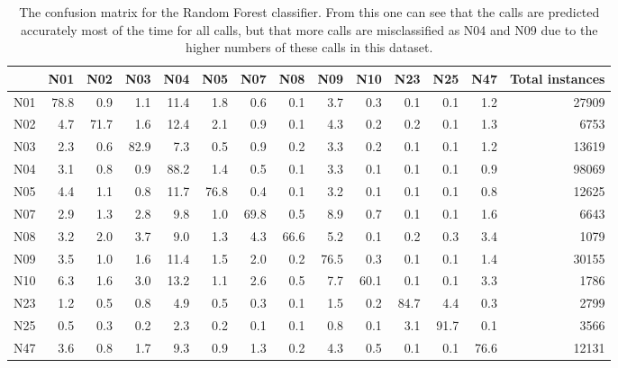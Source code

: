 \documentclass[12pt,oneside]{book}
\begin{document}
\begin{table}
\small
\begin{tabular}{|l|r|r|r|r|r|r|r|r|r|r|r|r|r|}
\hline
      &    N01  &   N02  &    N03  &    N04  &   N05  &   N07  &  N08  &    N09  &   N10  &   N23  &   N25  &   N47  & Total instances\\
\hline
 N01  &  78.8   &   0.9   &   1.1  &  11.4   &  1.8   &   0.6  &   0.1  &  3.7   &   0.3  &  0.1   &   0.1  &  1.2   & 27909  \\
 N02  &   4.7   &  71.7   &   1.6  &  12.4   &  2.1   &   0.9  &   0.1 &   4.3   &   0.2  &  0.2   &   0.1  &  1.3   & 6753   \\
 N03  &   2.3   &   0.6   &  82.9  &   7.3   &  0.5   &   0.9  &   0.2 &   3.3   &   0.2  &  0.1   &   0.1  &  1.2   & 13619  \\
 N04  &   3.1   &   0.8   &   0.9  &  88.2   &  1.4   &   0.5  &   0.1 &   3.3   &   0.1  &  0.1   &   0.1  &  0.9   & 98069  \\
 N05  &   4.4   &   1.1   &   0.8  &  11.7   & 76.8   &   0.4  &   0.1 &   3.2   &   0.1  &  0.1   &   0.1  &  0.8   & 12625  \\
 N07  &   2.9   &   1.3   &   2.8  &   9.8   &  1.0   &  69.8  &   0.5 &   8.9   &   0.7  &  0.1   &   0.1  &  1.6   & 6643   \\
 N08  &   3.2   &   2.0   &   3.7  &   9.0   &  1.3   &   4.3  &  66.6 &   5.2   &   0.1  &  0.2   &   0.3  &  3.4   & 1079   \\
 N09  &   3.5   &   1.0   &   1.6  &  11.4   &  1.5   &   2.0  &   0.2 &  76.5   &   0.3  &  0.1   &   0.1  &  1.4   & 30155  \\
 N10  &   6.3   &   1.6   &   3.0  &  13.2   &  1.1   &   2.6  &   0.5 &   7.7   &  60.1  &  0.1   &   0.1  &  3.3   & 1786   \\
 N23  &   1.2   &   0.5   &   0.8  &   4.9   &  0.5   &   0.3  &   0.1 &   1.5   &   0.2  & 84.7   &   4.4  &  0.3   & 2799   \\
 N25  &   0.5   &   0.3   &   0.2  &   2.3   &  0.2   &   0.1  &   0.1 &   0.8   &   0.1  &  3.1   &  91.7  &  0.1   & 3566   \\
 N47  &   3.6   &   0.8   &   1.7  &   9.3   &  0.9   &   1.3  &   0.2 &   4.3   &   0.5  &  0.1   &   0.1  & 76.6   & 12131  \\
\hline
\end{tabular}
\caption{The confusion matrix for the Random Forest classifier.
  From this one can see that the calls are predicted accurately most
  of the time for all calls, but that more calls are misclassified as
  N04 and N09 due to the higher numbers of these calls in this
  dataset. }
\label{table:CallConfusionMatrix}
\normalsize
\end{table}
\end{document}
